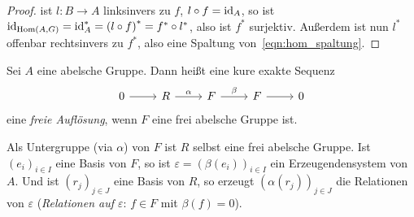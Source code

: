 \begin{proof}
  ist $l \colon B \to A$ linksinvers zu $f$, $l \circ f = \operatorname{id}_A$, so ist $\operatorname{id}_{\mathrm{Hom}(A,G)} = \operatorname{id}_{A}^* = {(l \circ f)}^* = f^* \circ l^*$, also ist $f^*$ surjektiv.
  Außerdem ist nun $l^*$ offenbar rechtsinvers zu $f^*$, also eine Spaltung von~\eqref{eqn:hom_spaltung}.
\end{proof}
\begin{defn}
  Sei $A$ eine abelsche Gruppe.
  Dann heißt eine kure exakte Sequenz
  \begin{equation*}
    \begin{tikzcd}
      0 \arrow{r}{}
        & R \arrow{r}{\alpha}
        & F \arrow{r}{\beta}
        & F \arrow{r}{}
        & 0
    \end{tikzcd}
  \end{equation*}
  eine \emph{freie Auflösung}, wenn $F$ eine frei abelsche Gruppe ist.
\end{defn}
\begin{kommentar}
  Als Untergruppe (via $\alpha$) von $F$ ist $R$ selbst eine frei abelsche Gruppe.
  Ist ${(e_i)}_{i \in I}$ eine Basis von $F$, so ist $\varepsilon = {(\beta(e_i))}_{i \in I}$ ein Erzeugendensystem von $A$.
  Und ist ${(r_j)}_{j \in J}$ eine Basis von $R$, so erzeugt ${(\alpha(r_j))}_{j \in J}$ die Relationen von $\varepsilon$ (\emph{Relationen auf $\varepsilon$}: $f \in F$ mit $\beta(f) = 0$).
\end{kommentar}

